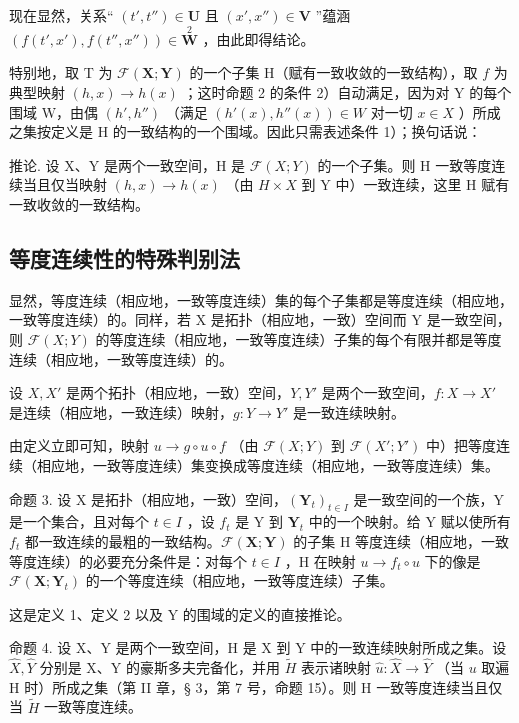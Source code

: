 现在显然，关系“ \((t', t'') \in \mathbf{U}\) 且 \((x', x'') \in \mathbf{V}\) ”蕴涵 \((f(t', x'), f(t'', x'')) \in \overset{2}{\mathbf{W}}\) ，由此即得结论。

特别地，取 T 为 \(\mathcal{F}(\mathbf{X};\mathbf{Y})\) 的一个子集 H（赋有一致收敛的一致结构），取 \(f\) 为典型映射 \((h,x)\to h(x)\) ；这时命题 2 的条件 2）自动满足，因为对 Y 的每个围域 W，由偶 \((h',h'')\) （满足 \((h'(x),h''(x))\in W\) 对一切 \(x\in X\) ）所成之集按定义是 H 的一致结构的一个围域。因此只需表述条件 1）；换句话说：

推论. 设 X、Y 是两个一致空间，H 是 \(\mathcal{F}(X;Y)\) 的一个子集。则 H 一致等度连续当且仅当映射 \((h,x) \to h(x)\) （由 \(H \times X\) 到 Y 中）一致连续，这里 H 赋有一致收敛的一致结构。

\subsection{等度连续性的特殊判别法}

显然，等度连续（相应地，一致等度连续）集的每个子集都是等度连续（相应地，一致等度连续）的。同样，若 X 是拓扑（相应地，一致）空间而 Y 是一致空间，则 \(\mathcal{F}(X;Y)\) 的等度连续（相应地，一致等度连续）子集的每个有限并都是等度连续（相应地，一致等度连续）的。

设 \(X, X'\) 是两个拓扑（相应地，一致）空间，\(Y, Y'\) 是两个一致空间，\(f: X \to X'\) 是连续（相应地，一致连续）映射，\(g: Y \to Y'\) 是一致连续映射。

由定义立即可知，映射 \(u \rightarrow g \circ u \circ f\) （由 \(\mathcal{F}(X; Y)\) 到 \(\mathcal{F}(X'; Y')\) 中）把等度连续（相应地，一致等度连续）集变换成等度连续（相应地，一致等度连续）集。

命题 3. 设 X 是拓扑（相应地，一致）空间，\((\mathbf{Y}_{t})_{t \in I}\) 是一致空间的一个族，Y 是一个集合，且对每个 \(t \in I\) ，设 \(f_{t}\) 是 Y 到 \(\mathbf{Y}_{t}\) 中的一个映射。给 Y 赋以使所有 \(f_{t}\) 都一致连续的最粗的一致结构。\(\mathcal{F}(\mathbf{X}; \mathbf{Y})\) 的子集 H 等度连续（相应地，一致等度连续）的必要充分条件是：对每个 \(t \in I\) ，H 在映射 \(u \to f_{t} \circ u\) 下的像是 \(\mathcal{F}(\mathbf{X}; \mathbf{Y}_{t})\) 的一个等度连续（相应地，一致等度连续）子集。

这是定义 1、定义 2 以及 Y 的围域的定义的直接推论。

命题 4. 设 X、Y 是两个一致空间，H 是 X 到 Y 中的一致连续映射所成之集。设 \(\hat{X}, \hat{Y}\) 分别是 X、Y 的豪斯多夫完备化，并用 \(\tilde{H}\) 表示诸映射 \(\hat{u}: \hat{X} \to \hat{Y}\) （当 \(u\) 取遍 H 时）所成之集（第 II 章，§ 3，第 7 号，命题 15）。则 H 一致等度连续当且仅当 \(\tilde{H}\) 一致等度连续。


